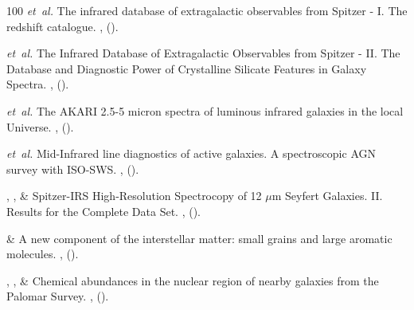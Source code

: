 \documentclass{nature2}
\begin{document}
\begin{thebibliography}{100}
 \emph{et~al.}
\newblock The infrared database of extragalactic observables from Spitzer - I. The redshift catalogue.
\newblock \emph{} \textbf{},
 ().

 \emph{et~al.}
\newblock The Infrared Database of Extragalactic Observables from Spitzer - II. The Database and Diagnostic Power of Crystalline Silicate Features in Galaxy Spectra.
\newblock \emph{} \textbf{},
 ().

 \emph{et~al.}
\newblock The AKARI 2.5-5 micron spectra of luminous infrared galaxies in the local Universe.
\newblock \emph{} \textbf{},
 ().

 \emph{et~al.}
\newblock Mid-Infrared line diagnostics of active galaxies. A spectroscopic AGN survey with ISO-SWS.
\newblock \emph{} \textbf{},
 ().

, ,  \& 
\newblock Spitzer-IRS High-Resolution Spectrocopy of 12 \ensuremath{\mu}m Seyfert Galaxies. II. Results for the Complete Data Set.
\newblock \emph{} \textbf{},
 ().

 \& 
\newblock A new component of the interstellar matter: small grains and large aromatic molecules.
\newblock \emph{} \textbf{},
 ().

, 
,
 \&
\newblock Chemical abundances in the nuclear region of nearby galaxies from the Palomar Survey.
\newblock \emph{} \textbf{},
 ().


\end{thebibliography}
\end{document}
